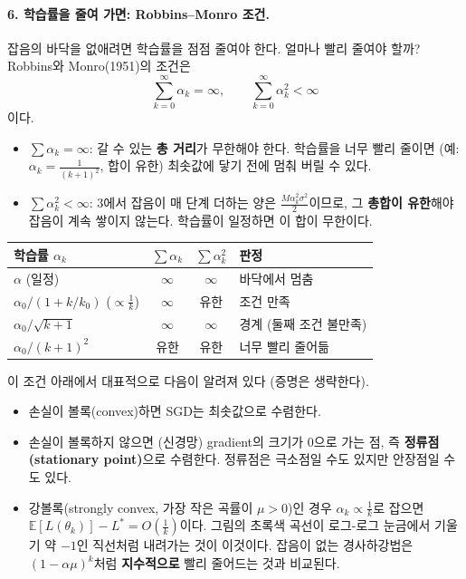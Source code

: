 \documentclass[11pt,a4paper]{article}
\begin{document}
\paragraph{6. 학습률을 줄여 가면: Robbins--Monro 조건.}
잡음의 바닥을 없애려면 학습률을 점점 줄여야 한다. 얼마나 빨리 줄여야 할까?
Robbins와 Monro(1951)의 조건은
\[
\boxed{
\sum_{k=0}^{\infty}\alpha_k=\infty,
\qquad
\sum_{k=0}^{\infty}\alpha_k^2<\infty
}
\]
이다.
\begin{itemize}[leftmargin=1.8em]
\item $\sum\alpha_k=\infty$: 갈 수 있는 \textbf{총 거리}가 무한해야 한다.
학습률을 너무 빨리 줄이면 (예: $\alpha_k=\frac{1}{(k+1)^2}$, 합이 유한) 최솟값에 닿기 전에 멈춰 버릴 수 있다.
\item $\sum\alpha_k^2<\infty$: 3에서 잡음이 매 단계 더하는 양은 $\frac{M\alpha_k^2\sigma^2}{2}$이므로,
그 \textbf{총합이 유한}해야 잡음이 계속 쌓이지 않는다. 학습률이 일정하면 이 합이 무한이다.
\end{itemize}

\begin{center}
\begin{tabular}{@{}lccl@{}}
\toprule
학습률 $\alpha_k$ & $\sum\alpha_k$ & $\sum\alpha_k^2$ & 판정 \\
\midrule
$\alpha$ (일정) & $\infty$ & $\infty$ & 바닥에서 멈춤 \\
$\alpha_0/(1+k/k_0)$ ($\propto\frac1k$) & $\infty$ & 유한 & 조건 만족 \\
$\alpha_0/\sqrt{k+1}$ & $\infty$ & $\infty$ & 경계 (둘째 조건 불만족) \\
$\alpha_0/(k+1)^2$ & 유한 & 유한 & 너무 빨리 줄어듦 \\
\bottomrule
\end{tabular}
\end{center}

이 조건 아래에서 대표적으로 다음이 알려져 있다 (증명은 생략한다).
\begin{itemize}[leftmargin=1.8em]
\item 손실이 볼록(convex)하면 SGD는 최솟값으로 수렴한다.
\item 손실이 볼록하지 않으면 (신경망) gradient의 크기가 $0$으로 가는 점, 즉 \textbf{정류점(stationary point)}으로 수렴한다.
정류점은 극소점일 수도 있지만 안장점일 수도 있다.
\item 강볼록(strongly convex, 가장 작은 곡률이 $\mu>0$)인 경우 $\alpha_k\propto\frac1k$로 잡으면
$\mathbb E[L(\theta_k)]-L^*=O\!\left(\frac1k\right)$이다.
그림의 초록색 곡선이 로그-로그 눈금에서 기울기 약 $-1$인 직선처럼 내려가는 것이 이것이다.
잡음이 없는 경사하강법은 $(1-\alpha\mu)^k$처럼 \textbf{지수적으로} 빨리 줄어드는 것과 비교된다.
\end{itemize}
\end{document}
